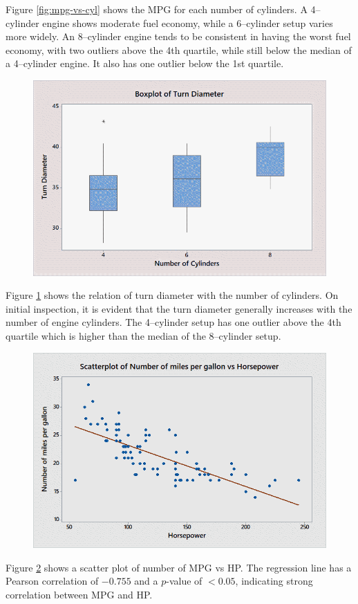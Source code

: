 \documentclass[10pt,a4paper]{article}
\begin{document}
Figure \ref{fig:mpg-vs-cyl} shows the MPG for each number of cylinders. A 4--cylinder engine shows moderate fuel economy, while a 6--cylinder setup varies more widely. An 8--cylinder engine tends to be consistent in having the worst fuel economy, with two outliers above the 4th quartile, while still below the median of a 4--cylinder engine. It also has one outlier below the 1st quartile.

\begin{figure}[tb]
	\centering
	\includegraphics[width=0.75\linewidth]{box-td_vs_cyl.png}
	\caption{}
	\label{fig:td-vs-cyl}
\end{figure}

Figure \ref{fig:td-vs-cyl} shows the relation of turn diameter with the number of cylinders. On initial inspection, it is evident that the turn diameter generally increases with the number of engine cylinders. The 4--cylinder setup has one outlier above the 4th quartile which is higher than the median of the 8--cylinder setup.

\begin{figure}[tb]
	\centering
	\includegraphics[width=0.75\linewidth]{mpg_vs_hp.png}
	\caption{}
	\label{fig:scatter-mpg-vs-hp}
\end{figure}

Figure \ref{fig:scatter-mpg-vs-hp} shows a scatter plot of number of MPG vs HP. The regression line has a Pearson correlation of $-0.755$ and a $p$-value of $< 0.05$, indicating strong correlation between MPG and HP.
\end{document}
